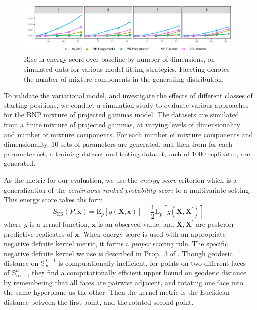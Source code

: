 \begin{figure}[htb]
    \caption{Rise in energy score over baseline by number of dimensions, on simulated data 
    for various model fitting strategies. Faceting denotes the number of mixture components 
    in the generating distribution. \label{fig:energyscore}}
    \includegraphics[width=\linewidth]{plots/energy_score}
\end{figure}

To validate the variational model, and investigate the effects of different classes of 
    starting positions, we conduct a simulation study to evaluate various approaches for
    the BNP mixture of projected gammas model.  The datasets are simulated from a finite
    mixture of projected gammas, at varying levels of dimensionality and number of mixture
    components.  For each number of mixture components and dimensionality, 10 sets of
    parameters are generated, and then from for each parameter set, a training dataset and 
    testing dataset, each of \num{1000} replicates, are generated.

As the metric for our evaluation, we use the \emph{energy score} criterion \citep{gneiting2007}
    which is a generalization of the \emph{continuous ranked probability score} to a multivariate
    setting.  This energy score takes the form
    \[
      S_{\text{ES}}(P, \bm{x}) = \text{E}_p\left[g(\bm{X},\bm{x})\right] - 
        \frac{1}{2}\text{E}_p\left[g(\bm{X},\bm{X}^{\prime})\right]
    \]
    where $g$ is a kernel function, $\bm{x}$ is an observed value, and 
    $\bm{X},\bm{X}^{\prime}$ are posterior predictive replicates of $\bm{x}$.
    When energy score is used with an appropriate negative definite kernel 
    metric, it forms a \emph{proper} scoring rule. The specific negative 
    definite kernel we use is described in Prop.~3 of \cite{trubey:pg}.  Though 
    geodesic distance on $\mathbb{S}_{\infty}^{d-1}$ is computationally inefficient,
    for points on two different faces of $\mathbb{S}_{\infty}^{d-1}$,
    they find a computationally efficient upper bound on geodesic distance by 
    remembering that all faces are pairwise adjacent, and rotating one face into the
    same hyperplane as the other.  Then the kernel metric is the Euclidean distance
    between the first point, and the rotated second point.
    
